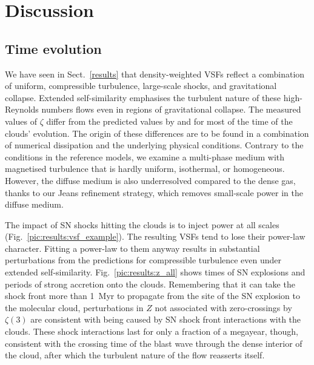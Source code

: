 \section{Discussion}\label{discussion}

\subsection{Time evolution}\label{discussion:normal}

We have seen in Sect.~\ref{results} that density-weighted VSFs reflect a combination of uniform, compressible turbulence, large-scale shocks, and gravitational collapse.  Extended self-similarity emphasises the turbulent nature of these high-Reynolds numbers flows even in regions of gravitational collapse. 
The measured values of $\zeta$ differ from the predicted values by \citet{She1994} and \citet{Boldyrev2002} for most of the time of the clouds' evolution.
The origin of these differences are to be found in a combination of numerical dissipation and the underlying physical conditions. 
Contrary to the conditions in the reference models, we examine a multi-phase medium with magnetised turbulence that is hardly uniform, isothermal, or homogeneous.
However, the diffuse medium is also underresolved compared to the dense gas, thanks to our Jeans refinement strategy, which removes small-scale power in the diffuse medium.

The impact of SN shocks hitting the clouds is to inject power at all scales (Fig.~\ref{pic:results:vsf_example}). 
The resulting VSFs tend to lose their power-law character. Fitting a power-law to them anyway results in substantial perturbations from the predictions for compressible turbulence even under extended self-similarity.
Fig.~\ref{pic:results:z_all} shows times of SN explosions and periods of strong accretion onto the clouds. 
Remembering that it can take the shock front more than 1~Myr to propagate from the site of the SN explosion to the molecular cloud, perturbations in $Z$ not associated with zero-crossings by $\zeta(3)$ are consistent with being caused by SN shock front interactions with the clouds.  
These shock interactions last for only a fraction of a megayear, though, consistent with the crossing time of the blast wave through the dense interior of the cloud, after which the turbulent nature of the flow reasserts itself.

